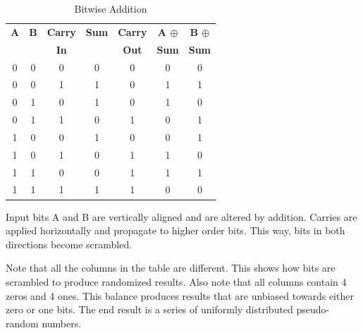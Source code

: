 \documentclass[preprint]{sigplanconf}
\begin{document}
\begin{table} [ht]
    \begin{center}
        \begin{tabular}{|c c c|c c|c c|}
            \hline
            \textbf{A} & \textbf{B} & \textbf{Carry} & \textbf{Sum} & \textbf{Carry} & \textbf{A $\oplus$} & \textbf{B $\oplus$} \\
                       &            & \textbf{In}    &              & \textbf{Out}   & \textbf{Sum}        & \textbf{Sum}        \\
            \hline
            0          & 0          & 0              & 0            & 0              & 0                   & 0                   \\
            0          & 0          & 1              & 1            & 0              & 1                   & 1                   \\
            0          & 1          & 0              & 1            & 0              & 1                   & 0                   \\
            0          & 1          & 1              & 0            & 1              & 0                   & 1                   \\
            1          & 0          & 0              & 1            & 0              & 0                   & 1                   \\
            1          & 0          & 1              & 0            & 1              & 1                   & 0                   \\
            1          & 1          & 0              & 0            & 1              & 1                   & 1                   \\
            1          & 1          & 1              & 1            & 1              & 0                   & 0                   \\
            \hline
        \end{tabular}
        \caption{Bitwise Addition}
        \label{tab-4}
    \end{center}
\end{table}

Input bits A and B are vertically aligned and are altered by addition. Carries are applied horizontally and propagate to higher order bits. This way, bits in both directions become scrambled.

Note that all the columns in the table are different. This shows how bits are scrambled to produce randomized results. Also note that all columns contain 4 zeros and 4 ones. This balance produces results that are unbiased towards either zero or one bits. The end result is a series of uniformly distributed pseudo-random numbers.
\end{document}
